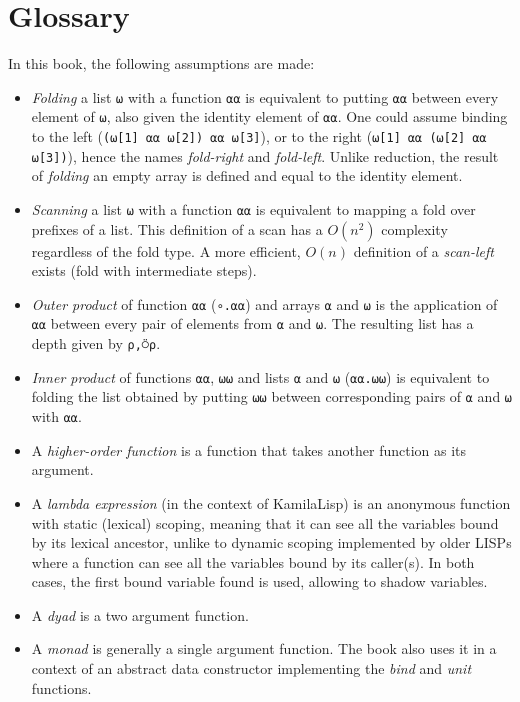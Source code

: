 
\chapter*{Glossary}

\par In this book, the following assumptions are made:

\begin{itemize}
    \item \textit{Folding} a list \verb|⍵| with a function \verb|⍺⍺| is equivalent to putting \verb|⍺⍺| between every element of \verb|⍵|, also given the identity element of \verb|⍺⍺|. One could assume binding to the left (\verb|(⍵[1] ⍺⍺ ⍵[2]) ⍺⍺ ⍵[3]|), or to the right (\verb|⍵[1] ⍺⍺ (⍵[2] ⍺⍺ ⍵[3])|), hence the names \textit{fold-right} and \textit{fold-left}. Unlike reduction, the result of \textit{folding} an empty array is defined and equal to the identity element.
    \item \textit{Scanning} a list \verb|⍵| with a function \verb|⍺⍺| is equivalent to mapping a fold over prefixes of a list. This definition of a scan has a $O(n^2)$ complexity regardless of the fold type. A more efficient, $O(n)$ definition of a \textit{scan-left} exists (fold with intermediate steps).
    \item \textit{Outer product} of function \verb|⍺⍺| (\verb|∘.⍺⍺|) and arrays \verb|⍺| and \verb|⍵| is the application of \verb|⍺⍺| between every pair of elements from \verb|⍺| and \verb|⍵|. The resulting list has a depth given by \verb|⍴,⍥⍴|.
    \item \textit{Inner product} of functions \verb|⍺⍺|, \verb|⍵⍵| and lists \verb|⍺| and \verb|⍵| (\verb|⍺⍺.⍵⍵|) is equivalent to folding the list obtained by putting \verb|⍵⍵| between corresponding pairs of \verb|⍺| and \verb|⍵| with \verb|⍺⍺|.
    \item A \textit{higher-order function} is a function that takes another function as its argument.
    \item A \textit{lambda expression} (in the context of KamilaLisp) is an anonymous function with static (lexical) scoping, meaning that it can see all the variables bound by its lexical ancestor, unlike to dynamic scoping implemented by older LISPs where a function can see all the variables bound by its caller(s). In both cases, the first bound variable found is used, allowing to shadow variables.
    \item A \textit{dyad} is a two argument function.
    \item A \textit{monad} is generally a single argument function. The book also uses it in a context of an abstract data constructor implementing the \textit{bind} and \textit{unit} functions.

\end{itemize}
